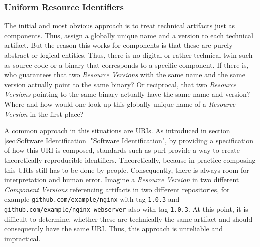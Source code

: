 \subsubsection{Uniform Resource Identifiers} 
The initial and most obvious approach is to treat technical artifacts just as components. Thus, assign a globally unique name and a version to each technical artifact. But the reason this works for components is that these are purely abstract or logical entities. Thus, there is no digital or rather technical twin such as source code or a binary that corresponds to a specific component. If there is, who guarantees that two \emph{Resource Versions} with the same name and the same version actually point to the same binary? Or reciprocal, that two \emph{Resource Versions} pointing to the same binary actually have the same name and version? Where and how would one look up this globally unique name of a \emph{Resource Version} in the first place?\par
A common approach in this situations are URIs. As introduced in section \ref{sec:Software Identification} "Software Identification", by providing a specification of how this URI is composed, standards such as purl provide a way to create theoretically reproducible identifiers. Theoretically, because in practice composing this URIs still has to be done by people. Consequently, there is always room for interpretation and human error. Imagine a \emph{Resource Version} in two different \emph{Component Versions} referencing artifacts in two different repositories, for example \lstinline|github.com/example/nginx| with tag \lstinline|1.0.3| and \lstinline|github.com/example/nginx-webserver| also with tag \lstinline|1.0.3|. At this point, it is difficult to determine, whether these are technically the same artifact and should consequently have the same URI. Thus, this approach is unreliable and impractical.

